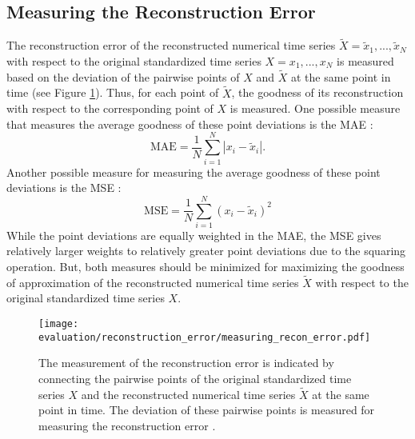 \subsection*{Measuring the Reconstruction Error}
The reconstruction error of the reconstructed numerical time series $\tilde{X} = \tilde{x}_1, ..., \tilde{x}_N$ with respect to the original standardized time series $X = x_1, ..., x_N$ is measured based on the deviation of the pairwise points of $X$ and $\tilde{X}$ at the same point in time (see Figure \ref{fig:measuring_recon_error}). Thus, for each point of $\tilde{X}$, the goodness of its reconstruction with respect to the corresponding point of $X$ is measured. \newline
One possible measure that measures the average goodness of these point deviations is the \ac{MAE} \cite{Comparison_SAX}:
\begin{equation*}
\text{MAE} = \frac{1}{N} \sum_{i=1}^{N} |x_i - \tilde{x}_i|.
\label{eq:MAE}
\end{equation*}
Another possible measure for measuring the average goodness of these point deviations is the \ac{MSE} \cite{T_SAX}:
\begin{equation*}
\text{MSE} = \frac{1}{N} \sum_{i=1}^{N} (x_i - \tilde{x}_i)^2
\label{eq:MSE}
\end{equation*}
While the point deviations are equally weighted in the \ac{MAE}, the \ac{MSE} gives relatively larger weights to relatively greater point deviations due to the squaring operation. But, both measures should be minimized for maximizing the goodness of approximation of the reconstructed numerical time series $\tilde{X}$ with respect to the original standardized time series $X$.
\begin{figure}[htb]
\centering
\texttt{[image: evaluation/reconstruction\_error/measuring\_recon\_error.pdf]}
\caption[Reconstruction Error - Measuring the Reconstruction Error]{The measurement of the reconstruction error is indicated by connecting the pairwise points of the original standardized time series $X$ and the reconstructed numerical time series $\tilde{X}$ at the same point in time. The deviation of these pairwise points is measured for measuring the reconstruction error \cite{Comparison_SAX,T_SAX}.}
\label{fig:measuring_recon_error}
\end{figure}
